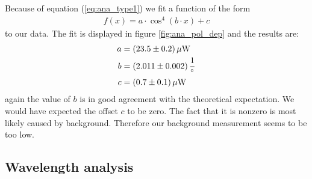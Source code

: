 \documentclass{protokoll_en}
\begin{document}
Because of equation (\ref{eq:ana_type1}) we fit a function of the form
\begin{align*}
f(x) = a\cdotp \cos^4(b\cdotp x)+c
\end{align*}
to our data. The fit is displayed in figure \ref{fig:ana_pol_dep} and the results are:
\begin{align}
a &= \unit[(23.5 \pm 0.2)]{\mu W}\\
\notag b &= \unit[(2.011 \pm 0.002)]{\frac{1}{^\circ}}\\
\notag c &= \unit[(0.7 \pm 0.1)]{\mu W}
\end{align}
again the value of $b$ is in good agreement with the theoretical expectation. We would have expected the offset $c$ to be zero. The fact that it is nonzero is most likely caused by background. Therefore our background measurement seems to be too low.
\subsection{Wavelength analysis}\label{subsec:ana_wavelengths}
\end{document}
